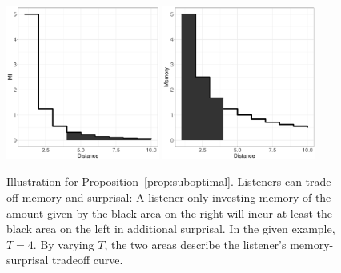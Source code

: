 \documentclass[11pt,letterpaper]{article}
\begin{document}








\begin{figure}
\includegraphics[width=0.45\textwidth]{toy/add-surp.pdf}
\includegraphics[width=0.45\textwidth]{toy/lower-mem.pdf}
	\caption{Illustration for Proposition~\ref{prop:suboptimal}. Listeners can trade off memory and surprisal: A listener only investing memory of the amount given by the black area on the right will incur at least the black area on the left in additional surprisal. In the given example, $T=4$. By varying $T$, the two areas describe the listener's memory-surprisal tradeoff curve.}\label{fig:listener-tradeoff-decay}
\end{figure}


\end{document}
